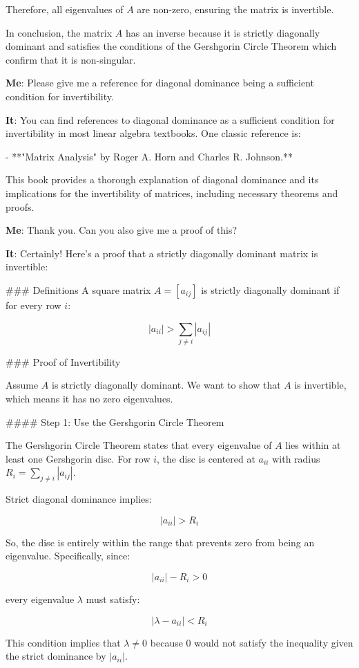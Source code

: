 \documentclass{article}
\begin{document}
Therefore, all eigenvalues of \( A \) are non-zero, ensuring the matrix is invertible.

In conclusion, the matrix \( A \) has an inverse because it is
strictly diagonally dominant and satisfies the conditions of the
Gershgorin Circle Theorem which confirm that it is non-singular.


{\bf Me}: Please give me a reference for diagonal dominance being a
sufficient condition for invertibility.

{\bf It}: You can find references to diagonal dominance as a sufficient condition for invertibility in most linear algebra textbooks. One classic reference is:

- **"Matrix Analysis" by Roger A. Horn and Charles R. Johnson.**

This book provides a thorough explanation of diagonal dominance and
its implications for the invertibility of matrices, including
necessary theorems and proofs.

{\bf Me}: Thank you.  Can you also give me a proof of this?

{\bf It}: Certainly! Here's a proof that a strictly diagonally dominant matrix is invertible:

### Definitions
A square matrix \( A = [a_{ij}] \) is strictly diagonally dominant if for every row \( i \):

\[
|a_{ii}| > \sum_{j \neq i} |a_{ij}|
\]

### Proof of Invertibility

Assume \( A \) is strictly diagonally dominant. We want to show that \( A \) is invertible, which means it has no zero eigenvalues.

#### Step 1: Use the Gershgorin Circle Theorem

The Gershgorin Circle Theorem states that every eigenvalue of \( A \) lies within at least one Gershgorin disc. For row \( i \), the disc is centered at \( a_{ii} \) with radius \( R_i = \sum_{j \neq i} |a_{ij}| \).

Strict diagonal dominance implies:

\[
|a_{ii}| > R_i
\]

So, the disc is entirely within the range that prevents zero from being an eigenvalue. Specifically, since:

\[
|a_{ii}| - R_i > 0
\]

every eigenvalue \( \lambda \) must satisfy:

\[
|\lambda - a_{ii}| < R_i
\]

This condition implies that \( \lambda \neq 0 \) because \( 0 \) would not satisfy the inequality given the strict dominance by \( |a_{ii}| \).
\end{document}
